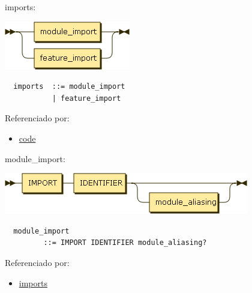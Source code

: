 \begin{minipage}{\textwidth}
  \protect\hypertarget{imports}{}{imports:}

  \includegraphics[width=2.16667in,height=0.83333in]{diagram/imports.png}

  \begin{verbatim}
  imports  ::= module_import
           | feature_import
  \end{verbatim}

  Referenciado por:

  \begin{itemize}
      \tightlist%
    \item
      \protect\hyperlink{code}{code}
  \end{itemize}

\end{minipage}

\begin{minipage}{\textwidth}
  \protect\hypertarget{module_import}{}{module\_import:}

  \includegraphics[width=4.20833in,height=0.70833in]{diagram/module_import.png}

  \begin{verbatim}
  module_import
         ::= IMPORT IDENTIFIER module_aliasing?
  \end{verbatim}

  Referenciado por:

  \begin{itemize}
      \tightlist%
    \item
      \protect\hyperlink{imports}{imports}
  \end{itemize}

\end{minipage}


